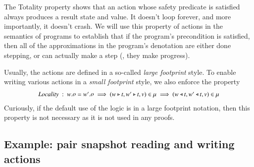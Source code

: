 The Totality property shows that an action whose safety predicate is
satisfied always produces a result state and value. It doesn't loop
forever, and more importantly, it doesn't crash. We will use this
property of actions in the semantics of programs to establish that if
the program's precondition is satisfied, then all of the
approximations in the program's denotation are either done stepping,
or can actually make a step (\ie, they make progress).

Usually, the actions are defined in a so-called \emph{large footprint}
style.
%
To enable writing various actions in a \emph{small footprint} style,
we also enforce the property 
%
\[
{\small
\begin{array}[t]{c}
\textit{Locality} ~:~ w.\mathother = w'.\mathother \implies (w \zag t, w' \zag t, v) \in \mu \implies (w \zig t, w' \zig t, v) \in \mu
\end{array}
}\]
%
Curiously, if the default use of the logic is in a large footprint
notation, then this property is not necessary as it is not used in any
proofs.
%

\subsection{Example: pair snapshot reading and writing actions}
\label{sec:ops}

